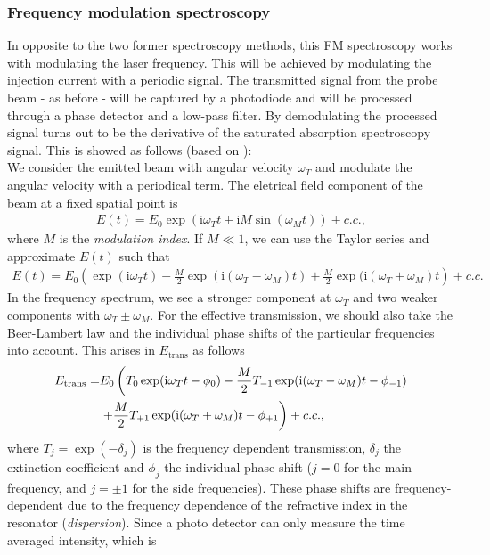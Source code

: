 \subsubsection{Frequency modulation spectroscopy}
In opposite to the two former spectroscopy methods, this FM spectroscopy works with modulating the laser frequency. This will be achieved by modulating the injection current with a periodic signal. The transmitted signal from the probe beam - as before - will be captured by a photodiode and will be processed through a phase detector and a low-pass filter. By demodulating the processed signal turns out to be the derivative of the saturated absorption spectroscopy signal. This is showed as follows (based on \cite{lit:mpi_FM_spec}):\\
We consider the emitted beam with angular velocity $\omega_T$ and modulate the angular velocity with a periodical term. The eletrical field component of the beam at a fixed spatial point is
\begin{align}
E(t)=E_0\exp\left(\mathrm{i}\omega_T t+\mathrm{i}M\sin(\omega_M t)\right)+c.c.,
\end{align}
where $M$ is the \emph{modulation index}. If $M\ll 1$, we can use the Taylor series and approximate $E(t)$ such that
\begin{align}
E(t)=E_0\left(\exp(\mathrm{i}\omega_T t)-\frac{M}{2}\exp(\mathrm{i}(\omega_T-\omega_M)t)+\frac{M}{2}\exp(\mathrm{i}(\omega_T+\omega_M)t\right)+c.c.
\end{align}
In the frequency spectrum, we see a stronger component at $\omega_T$ and two weaker components with $\omega_T\pm\omega_M$. For the effective transmission, we should also take the Beer-Lambert law and the individual phase shifts of the particular frequencies into account. This arises in $E_\text{trans}$ as follows
\begin{align}
E_\text{trans}=&E_0\left(T_0\exp(\mathrm{i}\omega_T t-\phi_0)-\frac{M}{2}T_{-1}\exp(\mathrm{i}(\omega_T-\omega_M)t-\phi_{-1})\right.\notag\\
&\left.+\frac{M}{2}T_{+1}\exp(\mathrm{i}(\omega_T+\omega_M)t-\phi_{+1}\right)+c.c.,
\end{align}
where $T_j=\exp(-\delta_j)$ is the frequency dependent transmission, $\delta_j$ the extinction coefficient and $\phi_j$ the individual phase shift ($j=0$ for the main frequency, and $j=\pm 1$ for the side frequencies). These phase shifts are frequency-dependent due to the frequency dependence of the refractive index in the resonator (\emph{dispersion}).
Since a photo detector can only measure the time averaged intensity, which is 
